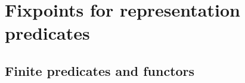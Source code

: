 \documentclass[thesis.tex]{subfiles}
\begin{document}
\chapter{Fixpoints for representation predicates}
\label{ch:fixpoints}
\section{Finite predicates and functors}
\end{document}
